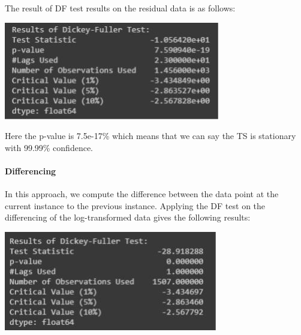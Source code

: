 			The result of DF test results on the residual data is as follows:

				\begin{center}
				\includegraphics[width=\linewidth]{figures/DF-Test-Results-on-residual-data.jpg}	
				\label{fig: DF Test Results on residual data}
				\end{center}

			Here the p-value is 7.5e-17\% which means that we can say the TS is stationary with 99.99\% confidence.

		\paragraph{Differencing}

			In this approach, we compute the difference between the data point at the current instance to the previous instance. Applying the DF test on the differencing \cite{18} of the log-transformed data gives the following results:

				\begin{center}
				\includegraphics[width=\linewidth]{figures/DF-Test-Results-for-log-transformed-Closing-price-after-differencing.jpg}	
				\label{fig: DF Test Results for log-transformed Closing price after differencing}
				\end{center}

